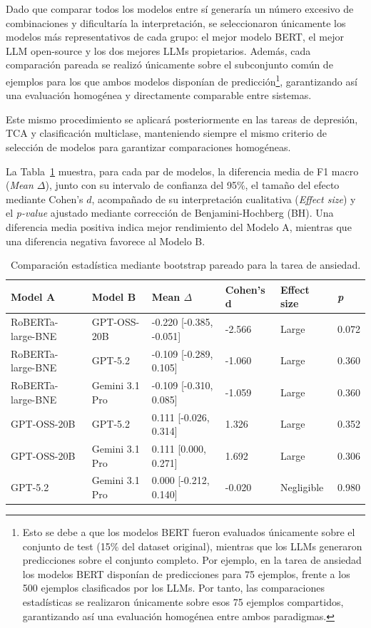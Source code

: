 Dado que comparar todos los modelos entre sí generaría un número excesivo de combinaciones y dificultaría la interpretación, se seleccionaron únicamente los modelos más representativos de cada grupo: el mejor modelo BERT, el mejor LLM open-source y los dos mejores LLMs propietarios. Además, cada comparación pareada se realizó únicamente sobre el subconjunto común de ejemplos para los que ambos modelos disponían de predicción\footnote{Esto se debe a que los modelos BERT fueron evaluados únicamente sobre el conjunto de test (15\% del dataset original), mientras que los \acp{LLM} generaron predicciones sobre el conjunto completo. Por ejemplo, en la tarea de ansiedad los modelos BERT disponían de predicciones para 75 ejemplos, frente a los 500 ejemplos clasificados por los \acp{LLM}. Por tanto, las comparaciones estadísticas se realizaron únicamente sobre esos 75 ejemplos compartidos, garantizando así una evaluación homogénea entre ambos paradigmas.}, garantizando así una evaluación homogénea y directamente comparable entre sistemas.

Este mismo procedimiento se aplicará posteriormente en las tareas de depresión, TCA y clasificación multiclase, manteniendo siempre el mismo criterio de selección de modelos para garantizar comparaciones homogéneas.

La Tabla~\ref{tab:bootstrap_ansiedad} muestra, para cada par de modelos, la diferencia media de F1 macro (\textit{Mean $\Delta$}), junto con su intervalo de confianza del 95\%, el tamaño del efecto mediante Cohen’s \(d\), acompañado de su interpretación cualitativa (\textit{Effect size}) y el \textit{p-value} ajustado mediante corrección de Benjamini-Hochberg (BH). Una diferencia media positiva indica mejor rendimiento del Modelo A, mientras que una diferencia negativa favorece al Modelo B.

\begin{table}[H]
	\centering
	\small
	\begin{tabular}{llllll}
		\hline
		\textbf{Model A} & \textbf{Model B} & \textbf{Mean $\Delta$} & \textbf{Cohen's d} & \textbf{Effect size} & \textbf{\textit{p}} \\
		\hline
		RoBERTa-large-BNE & GPT-OSS-20B & -0.220 [-0.385, -0.051] & -2.566 & Large & 0.072 \\
		RoBERTa-large-BNE & GPT-5.2 & -0.109 [-0.289, 0.105] & -1.060 & Large & 0.360 \\
		RoBERTa-large-BNE & Gemini 3.1 Pro & -0.109 [-0.310, 0.085] & -1.059 & Large & 0.360 \\
		GPT-OSS-20B & GPT-5.2 & 0.111 [-0.026, 0.314] & 1.326 & Large & 0.352 \\
		GPT-OSS-20B & Gemini 3.1 Pro & 0.111 [0.000, 0.271] & 1.692 & Large & 0.306 \\
		GPT-5.2 & Gemini 3.1 Pro & 0.000 [-0.212, 0.140] & -0.020 & Negligible & 0.980 \\
		\hline
	\end{tabular}
	\caption{Comparación estadística mediante bootstrap pareado para la tarea de ansiedad.}
	\label{tab:bootstrap_ansiedad}
\end{table}

